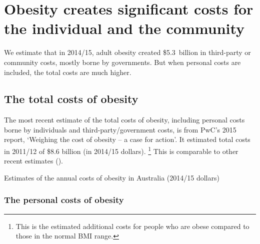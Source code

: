 \documentclass[embargoed]{grattan}
\begin{document}
\chapter{Obesity creates significant costs for the individual and the community}\label{obesity-creates-significant-costs-for-the-individual-and-society}

We estimate that in 2014/15, adult obesity created \$5.3~billion in third-party or community costs, mostly borne by governments.
But when personal costs are included, the total costs are much higher.

\section{The total costs of obesity }\label{the-total-costs-of-obesity}

The most recent estimate of the total costs of obesity, including personal costs borne by individuals and third-party/government costs, is from PwC's 2015 report, `Weighing the cost of obesity -- a case for action'.
It estimated total costs in 2011/12 of \$8.6 billion (in 2014/15 dollars).%
\footnote{This is the estimated additional costs for people who are obese compared to those in the normal BMI range.} 
This is comparable to other recent estimates ().

\begin{table}
\caption{Estimates of the annual costs of obesity in Australia (2014/15 dollars)}\label{tbl:estimates-annual-costs-obesity-Australia}




\end{table}

\subsection{The personal costs of obesity }\label{the-personal-costs-of-obesity}
\end{document}
